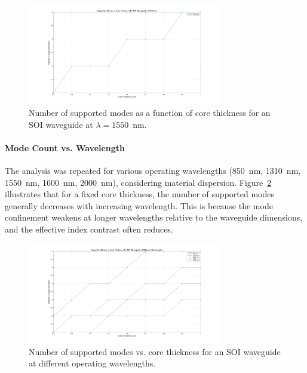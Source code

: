 \documentclass[10pt, a4paper]{article}
\begin{document}
\begin{figure}[h!]
    \centering
    \includegraphics[width=0.75\textwidth]{task1/modes_vs_thickness_SOI_1550nm.png}
    \caption{Number of supported modes as a function of core thickness for an SOI waveguide at $\lambda = 1550$~nm.}
    \label{fig:modes_vs_thickness_SOI_1550nm}
\end{figure}

\paragraph{Mode Count vs. Wavelength}
The analysis was repeated for various operating wavelengths (850~nm, 1310~nm, 1550~nm, 1600~nm, 2000~nm), considering material dispersion. Figure~\ref{fig:modes_vs_thickness_SOI_wavelengths} illustrates that for a fixed core thickness, the number of supported modes generally decreases with increasing wavelength. This is because the mode confinement weakens at longer wavelengths relative to the waveguide dimensions, and the effective index contrast often reduces.

\begin{figure}[h!]
    \centering
    \includegraphics[width=0.75\textwidth]{task1/modes_vs_thickness_SOI_wavelengths.png}
    \caption{Number of supported modes vs. core thickness for an SOI waveguide at different operating wavelengths.}
    \label{fig:modes_vs_thickness_SOI_wavelengths}
\end{figure}
\end{document}
